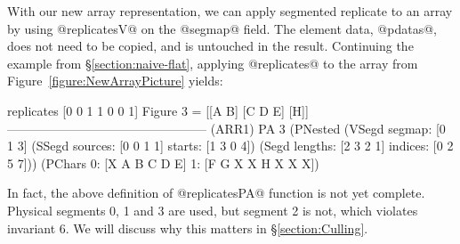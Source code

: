 \par
With our new array representation, we can apply segmented replicate to an array by using @replicatesV@ on the @segmap@ field. The element data, @pdatas@, does not need to be copied, and is untouched in the result. Continuing the example from \S\ref{section:naive-flat}, applying @replicates@ to the array from Figure~\ref{figure:NewArrayPicture} yields:
\par
\begin{small}
\begin{code}
   replicates [0 0 1 1 0 0 1] {Figure 3}
 = [[A B] [C D E] [H]]
 ------------------------------------------------ (ARR1)
  PA 3 (PNested
   (VSegd  segmap: [0 1 3]
   (SSegd sources: [0 0 1 1]  starts: [1 3 0 4])
   (Segd  lengths: [2 3 2 1] indices: [0 2 5 7]))
   (PChars 0: [X A B C D E]
           1: [F G X X H X X X])
\end{code}
\end{small}
\par
In fact, the above definition of @replicatesPA@ function is not yet complete. Physical segments 0, 1 and 3 are used, but segment 2 is not, which violates invariant 6. We will discuss why this matters in \S\ref{section:Culling}.


